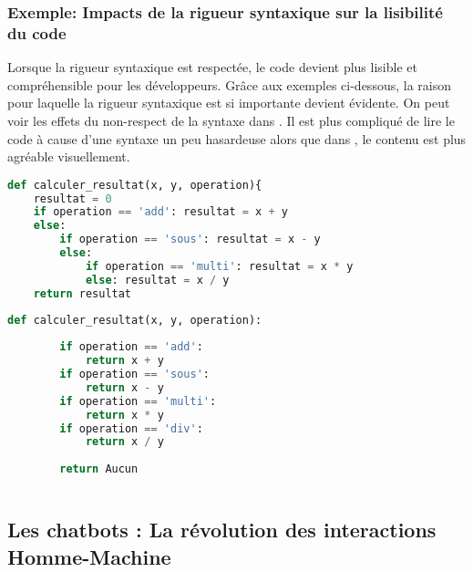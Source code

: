 \documentclass{rapport}
\begin{document}
\newpage
\subsubsection{Exemple: Impacts de la rigueur syntaxique sur la lisibilité du code}
Lorsque la rigueur syntaxique est respectée, le code devient plus lisible et compréhensible pour les développeurs. Grâce aux exemples ci-dessous, la raison pour laquelle la rigueur syntaxique est si importante devient évidente. On peut voir les effets du non-respect de la syntaxe dans . Il est plus compliqué de lire le code à cause d'une syntaxe un peu hasardeuse alors que dans , le contenu est plus agréable visuellement.\\
\begin{minipage}[t]{0.49\linewidth}
\label{lstlisting:WithoutSyntax}
\label{lstlisting:WithSyntax}
\begin{lstlisting}[language=python, style = code_style_no_border]
def calculer_resultat(x, y, operation){
    resultat = 0
    if operation == 'add': resultat = x + y
    else:
        if operation == 'sous': resultat = x - y
        else:
            if operation == 'multi': resultat = x * y
            else: resultat = x / y
    return resultat
\end{lstlisting}
\end{minipage}
\hfill\vrule\hfill
\begin{minipage}[t]{0.49\linewidth}
    \begin{lstlisting}[language=python, style = code_style_no_border]
    def calculer_resultat(x, y, operation):
        
        if operation == 'add':
            return x + y
        if operation == 'sous':
            return x - y
        if operation == 'multi':
            return x * y
        if operation == 'div':
            return x / y
        
        return Aucun
    
    \end{lstlisting}
\end{minipage}

\newpage
\subsection{Les chatbots : La révolution des interactions Homme-Machine}
\end{document}
